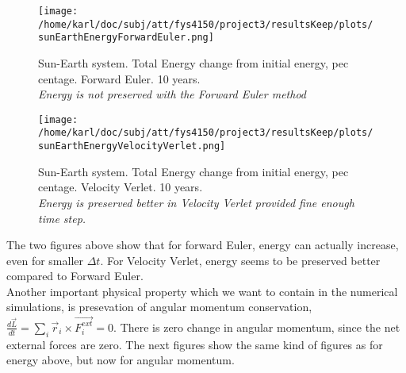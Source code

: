 \documentclass{article}
\begin{document}
\begin{minipage}{.45\textwidth} 
	\begin{figure}[H]
		\centering
		\texttt{[image: /home/karl/doc/subj/att/fys4150/project3/resultsKeep/plots/sunEarthEnergyForwardEuler.png]}
		\caption{Sun-Earth system. Total Energy change from initial energy, pec centage. Forward Euler. 10 years. \\ \textit{Energy is not preserved with the Forward Euler method}}
		\label{1}
	\end{figure}
\end{minipage}\hfill
\begin{minipage}{.45\textwidth} 
	\begin{figure}[H]
		\centering
		\texttt{[image: /home/karl/doc/subj/att/fys4150/project3/resultsKeep/plots/sunEarthEnergyVelocityVerlet.png]}
		\caption{Sun-Earth system. Total Energy change from initial energy, pec centage. Velocity Verlet. 10 years. \\ \textit{Energy is preserved better in Velocity Verlet provided fine enough time step. }}
		\label{1}
	\end{figure}
\end{minipage}\hfill
\vspace{2ex}

The two figures above show that for forward Euler, energy can actually increase, even for smaller $\Delta t$. For Velocity Verlet, energy seems to be preserved better compared to Forward Euler. \\

Another important physical property which we want to contain in the numerical simulations, is presevation of angular momentum conservation, $\frac{d \vec{L}}{dt} = \sum_i \vec{r}_i \times \vec{F^{ext}_i} = 0$. There is zero change in angular momentum, since the net external forces are zero. The next figures show the same kind of figures as for energy above, but now for angular momentum. 
\end{document}
